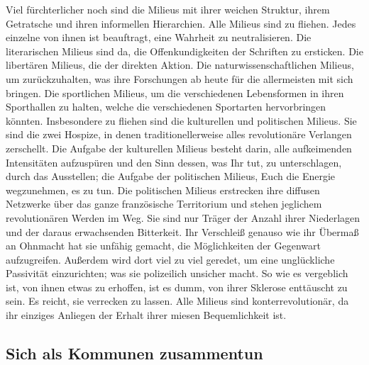 Viel fürchterlicher noch sind die Milieus mit ihrer weichen
Struktur, ihrem Getratsche und ihren informellen Hierarchien. Alle
Milieus sind zu fliehen. Jedes einzelne von ihnen ist beauftragt,
eine Wahrheit zu neutralisieren. Die literarischen Milieus sind da,
die Offenkundigkeiten der Schriften zu ersticken. Die libertären
Milieus, die der direkten Aktion. Die naturwissenschaftlichen
Milieus, um zurückzuhalten, was ihre Forschungen ab heute für die
allermeisten mit sich bringen. Die sportlichen Milieus, um die
verschiedenen Lebensformen in ihren Sporthallen zu halten, welche
die verschiedenen Sportarten hervorbringen könnten. Insbesondere zu
fliehen sind die kulturellen und politischen Milieus. Sie sind die
zwei Hospize, in denen traditionellerweise alles revolutionäre
Verlangen zerschellt. Die Aufgabe der kulturellen Milieus besteht
darin, alle aufkeimenden Intensitäten aufzuspüren und den Sinn
dessen, was Ihr tut, zu unterschlagen, durch das Ausstellen; die
Aufgabe der politischen Milieus, Euch die Energie wegzunehmen, es
zu tun. Die politischen Milieus erstrecken ihre diffusen Netzwerke
über das ganze französische Territorium und stehen jeglichem
revolutionären Werden im Weg. Sie sind nur Träger der Anzahl ihrer
Niederlagen und der daraus erwachsenden Bitterkeit. Ihr Verschleiß
genauso wie ihr Übermaß an Ohnmacht hat sie unfähig gemacht, die
Möglichkeiten der Gegenwart aufzugreifen. Außerdem wird dort viel
zu viel geredet, um eine unglückliche Passivität einzurichten; was
sie polizeilich unsicher macht. So wie es vergeblich ist, von ihnen
etwas zu erhoffen, ist es dumm, von ihrer Sklerose enttäuscht zu
sein. Es reicht, sie verrecken zu lassen.
Alle Milieus sind konterrevolutionär, da ihr einziges Anliegen der
Erhalt ihrer miesen Bequemlichkeit ist.

\subsection{Sich als Kommunen zusammentun}

